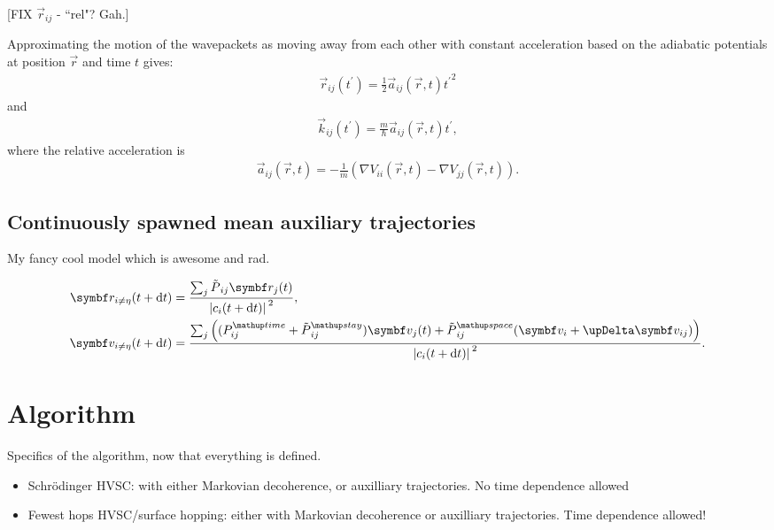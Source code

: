 [FIX $\vec r_{ij}$ - ``rel"? Gah.]

Approximating the motion of the wavepackets as moving away from each other with constant acceleration based on the adiabatic potentials at position $\vec r$ and time $t$ gives:
\begin{align}
\vec r_{ij}(t^\prime) = \frac12\vec a_{ij}(\vec r, t) {t^\prime}^2
\end{align}
and
\begin{align}
\vec k_{ij}(t^\prime) = \frac m \hbar \vec a_{ij}(\vec r, t) t^\prime,
\end{align}
where the relative acceleration is
\begin{align}
\vec a_{ij}(\vec r, t) = -\frac1 m\left(\nabla V_{ii}(\vec r, t) - \nabla V_{jj}(\vec r, t)\right).
\end{align}
\subsection{Continuously spawned mean auxiliary trajectories}

My fancy cool model which is awesome and rad.

\begin{align}
\vec r_{i\neq\eta}(t + \dd t) &= \frac{\sum_j \tilde P_{ij}\vec r_j(t)}
{\abs{c_i(t+\dd t)}^2},\\
\vec v_{i\neq\eta}(t + \dd t) &= \frac{\sum_j 
\left((P^\up{time}_{ij} + \tilde P^\up{stay}_{ij})\vec v_j(t)
+ \tilde P^\up{space}_{ij}(\vec v_i + \upDelta \vec v_{ij})\right)}
{\abs{c_i(t+\dd t)}^2}.
\end{align}


\section{Algorithm}\label{sec:HVSC_algorithm}




Specifics of the algorithm, now that everything is defined.

\begin{itemize}
    \item Schr\"odinger HVSC: with either Markovian decoherence, or auxilliary trajectories. No time dependence allowed

    \item Fewest hops HVSC/surface hopping: either with Markovian decoherence or
    auxilliary trajectories. Time dependence allowed!

\end{itemize}

